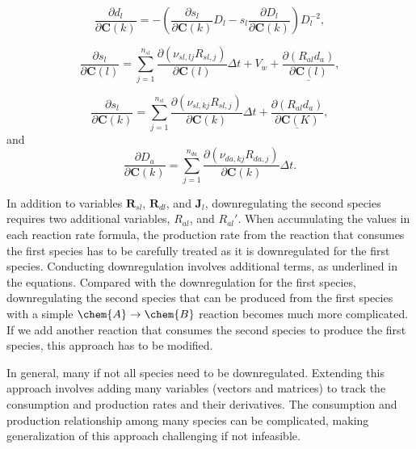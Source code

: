 \documentclass[gmd, manuscript]{copernicus}
\begin{document}
\begin{equation}
\frac{\partial d_l}{\partial \mathbf{C}(k)} =-\left(\frac{\partial
s_l}{\partial \mathbf{C}(k)} D_l - s_l \frac{\partial D_l}{\partial
\mathbf{C}(k)}\right)D_l^{-2}, 
\end{equation}

\begin{equation}
\frac{\partial s_l}{\partial \mathbf{C}(l)} =\sum_{j=1}^{n_{sl}}
\frac{\partial (\nu_{sl,lj}R_{sl,j})}{\partial \mathbf{C}(l)} \Delta t + V_w +
\underline{\frac{\partial (R_{al}d_a)}{\partial \mathbf{C}(l)}}, 
\end{equation}

\begin{equation}
\frac{\partial s_l}{\partial \mathbf{C}(k)} =\sum_{j=1}^{n_{sl}} \frac{\partial
(\nu_{sl,kj}R_{sl,j})}{\partial \mathbf{C}(k)} \Delta t +
\underline{\frac{\partial (R_{al}d_a)}{\partial \mathbf{C}(K)}}, 
\end{equation}
and
\begin{equation}
\frac{\partial D_a}{\partial \mathbf{C}(k)} =\sum_{j=1}^{n_{da}}
\frac{\partial (\nu_{da,kj}R_{da,j})}{\partial \mathbf{C}(k)} \Delta t. 
\end{equation}

In addition to variables $\mathbf{R}_{sl}$, $\mathbf{R}_{dl}$, and $\mathbf{J}_l$,
downregulating the second species requires two additional variables,
$R_{al}$, and $R_{al}'$. When accumulating the values in each reaction rate
formula, the production rate from the reaction that consumes the first species
has to be carefully treated as it is downregulated for the first species.
Conducting downregulation involves additional terms, as underlined in the
equations. Compared with the downregulation for the first species,
downregulating the second species that can be produced from the first species
with a simple $\chem{A}\rightarrow\chem{B}$ reaction becomes much more
complicated. If we add another reaction that consumes the second species to
produce the first species, this approach has to be modified. 

In general, many if not all species need to be downregulated. Extending this
approach involves adding many variables (vectors and matrices) to track the
consumption and production rates and their derivatives. The consumption and
production relationship among many species can be complicated, making
generalization of this approach challenging if not infeasible. 

\clearpage
\end{document}
